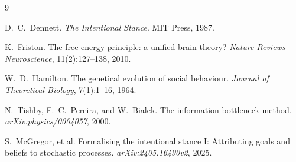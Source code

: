 \documentclass[11pt]{article}
\begin{document}
\begin{thebibliography}{9}

D.~C.~Dennett.
\newblock \emph{The Intentional Stance}.
\newblock MIT Press, 1987.

K.~Friston.
\newblock The free-energy principle: a unified brain theory?
\newblock \emph{Nature Reviews Neuroscience}, 11(2):127–138, 2010.

W.~D.~Hamilton.
\newblock The genetical evolution of social behaviour.
\newblock \emph{Journal of Theoretical Biology}, 7(1):1–16, 1964.

N.~Tishby, F.~C.~Pereira, and W.~Bialek.
\newblock The information bottleneck method.
\newblock \emph{arXiv:physics/0004057}, 2000.

S.~McGregor, et al.
\newblock Formalising the intentional stance I: Attributing goals and beliefs to stochastic processes.
\newblock \emph{arXiv:2405.16490v2}, 2025.

\end{thebibliography}
\end{document}
